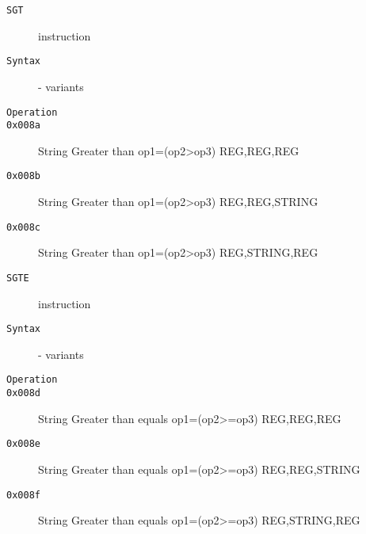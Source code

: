 \begin{description}
\item[\texttt{SGT}] instruction\\
\item[\texttt{Syntax}] - variants\\

\item[\texttt{Operation}]
\item[\texttt{}]
\item[\texttt{0x008a}] String Greater than op1=(op2>op3)  {REG,REG,REG}       \\
\item[\texttt{0x008b}] String Greater than op1=(op2>op3)  {REG,REG,STRING}    \\
\item[\texttt{0x008c}] String Greater than op1=(op2>op3)  {REG,STRING,REG}    \\
\end{description}
\clearpage
\begin{description}
\item[\texttt{SGTE}] instruction\\
\item[\texttt{Syntax}] - variants\\

\item[\texttt{Operation}]
\item[\texttt{}]
\item[\texttt{0x008d}] String Greater than equals op1=(op2>=op3)  {REG,REG,REG}       \\
\item[\texttt{0x008e}] String Greater than equals op1=(op2>=op3)  {REG,REG,STRING}    \\
\item[\texttt{0x008f}] String Greater than equals op1=(op2>=op3)  {REG,STRING,REG}    \\
\end{description}
